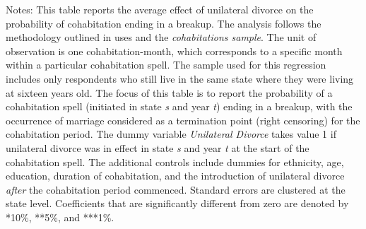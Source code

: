 \begin{table}[H]\centering                                  \scriptsize                                 \caption{The average effect of unilateral divorce on the probability that a cohabitation spell ends in a breakup. Unit of observation: cohabitation-month. Sample of never movers}                                   \label{tab:tabdurbk}                                 
\begin{minipage}{\textwidth}
\scriptsize\smallskip
Notes: This table reports the average effect of unilateral divorce on the probability of cohabitation ending in a breakup. The analysis follows the methodology outlined in \cite{borusyak2021} uses and the \textit{cohabitations sample}. The unit of observation is one cohabitation-month, which corresponds to a specific month within a particular cohabitation spell.  The sample used for this regression includes only respondents who still live in the same state where they were living at sixteen years old. The focus of this table is to report the probability of a cohabitation spell (initiated in state \textit{s} and year \textit{t}) ending in a breakup, with the occurrence of marriage considered as a termination point (right censoring) for the cohabitation period. The dummy variable \textit{Unilateral Divorce} takes value 1 if unilateral divorce was in effect in state \textit{s} and year \textit{t} at the start of the cohabitation spell. The additional controls include dummies for ethnicity, age, education, duration of cohabitation, and the introduction of unilateral divorce \textit{after} the cohabitation period commenced. Standard errors are clustered at the state level. Coefficients that are significantly different from zero are denoted by *10\%, **5\%, and ***1\%.
\\
\end{minipage}
\end{table}
